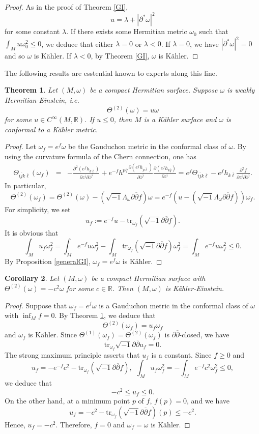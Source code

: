 \documentclass[12pt]{amsart}
\newcommand\bp{{\bar\partial}}
\theoremstyle{plain}
\newtheorem{thm}{Theorem}[section]
\newtheorem{cor}[thm]{Corollary}
\theoremstyle{definition}
\newcommand{\btheorem}{\begin{thm}}
\newcommand{\etheorem}{\end{thm}}
\newcommand{\bcorollary}{\begin{cor}}
\newcommand{\ecorollary}{\end{cor}}
\newcommand{\bproof}{\begin{proof}}
\newcommand{\eproof}{\end{proof}}
\newcommand{\sq}{\sqrt{-1}}
\newcommand{\p}{\partial}
\renewcommand{\bar}{\overline}
\newcommand{\beq}{\begin{equation}}
\newcommand{\eeq}{\end{equation}}
\newcommand{\ee}{\end{eqnarray*}}
\newcommand{\be}{\begin{eqnarray*}}
\renewcommand{\bp}{\bar{\partial}}
\renewcommand{\>}{\rightarrow}
\newcommand{\R}{{\mathbb R}}
\numberwithin{equation}{section} %
\begin{document}
\bproof  As in the proof of Theorem \ref{GI}, $$u=\lambda+|\p^*\omega|^2$$ for some constant $\lambda$.  If there exists some Hermitian metric $\omega_0$ such that $\int_M u\omega_0^2\leq 0$, we deduce that either $\lambda=0$ or $\lambda<0$. If $\lambda=0$, we have $|\p^*\omega|^2=0$ and so $\omega$ is K\"ahler. If $\lambda<0$, by Theorem \ref{GI}, $\omega$ is K\"ahler.
\eproof 
	
	\noindent 
	The following results are esstential known to experts along this line.
	
	\btheorem\label{generalHE} Let $(M,\omega)$ be a compact Hermitian surface. Suppose $\omega$ is weakly Hermitian-Einstein, i.e. 
	\beq \Theta^{(2)}(\omega)=u \omega \eeq 
	for some $u\in C^\infty(M,\R)$. If $u\leq 0$, then $M$ is a K\"ahler surface and $\omega$ is  conformal to a K\"ahler metric.
	\etheorem
	
	\bproof  Let $\omega_f=e^f\omega$ be the Gauduchon metric in the conformal class of $\omega$.  By using the curvature formula of the Chern connection, one has  
	\be \Theta_{i\bar j k\bar
		\ell}(\omega_f)&=&-\frac{\p^2 (e^f h_{k\bar \ell})}{\p z^i\p \bar z^j}+e^{-f}h^{p\bar
		q}\frac{\p(e^f h_{p\bar \ell})}{\p \bar z^j}\frac{\p (e^fh_{k\bar q})}{\p
		z^i}=e^f\Theta_{i\bar j k\bar\ell }-e^f h_{k\bar \ell } \frac{\p^2 f}{\p z^i\p \bar z^j}.  \ee  In particular,
	\beq \Theta^{(2)}(\omega_f)=\Theta^{(2)}(\omega)-\left(\sqrt{-1} \Lambda_\omega \partial \bar{\partial} f\right) \omega=e^{-f}\left(u-\left(\sqrt{-1} \Lambda_\omega \partial \bar{\partial} f\right)\right) \omega_f. \eeq 
For simplicity, we set \beq u_f:=e^{-f}u- \mathrm{tr}_{\omega_f} (\sq \p\bp f). \eeq 	
	It is obvious that $$\int_M u_f \omega_f^2=\int_M e^{-f}u \omega_f^2-\int_M \mathrm{tr}_{\omega_f} (\sq \p\bp f) \omega_f^2=\int_M e^{-f}u \omega_f^2\leq 0.$$
	By Proposition \ref{generalGI}, $\omega_f=e^f\omega$ is K\"ahler.
	\eproof 
	
	

		\bcorollary  Let $(M,\omega)$ be a compact Hermitian surface with $\Theta^{(2)}(\omega)=-c^2\omega$ for some $c\in \R$. 
	Then $(M,\omega)$ is  K\"ahler-Einstein.
	\ecorollary 
	
	\bproof  Suppose  that $\omega_f=e^f\omega$ is a Gauduchon metric in the conformal class of $\omega$ with $\inf_M f=0$. By Theorem \ref{generalHE}, we deduce that $$\Theta^{(2)}(\omega_f)=u_f\omega_f$$ and $\omega_f$ is K\"ahler.  Since $\Theta^{(1)}(\omega_f)=\Theta^{(2)}(\omega_f)$ is $\p\bp$-closed, we have   $$\mathrm{tr}_{\omega_f} \sq \p\bp u_f=0.$$ The strong maximum principle asserts that $u_f$ is a constant. Since $f\geq 0$ and $$u_f=-e^{-f}c^2- \mathrm{tr}_{\omega_f} (\sq \p\bp f),\ \  \int_M u_f \omega_f^2=-\int_M e^{-f}c^2 \omega_f^2\leq 0,$$ we deduce that $$-c^2\leq u_f\leq 0.$$ On the other hand, at a minimum point $p$ of $f$, $f(p)=0$, and we have 
	$$u_f=-c^2- \mathrm{tr}_{\omega_f} (\sq \p\bp f)(p)\leq -c^2.$$
	Hence, $u_f=-c^2$. Therefore,  $f=0$ and $\omega_f=\omega$ is K\"ahler. 
	\eproof 	
	
\end{document}
